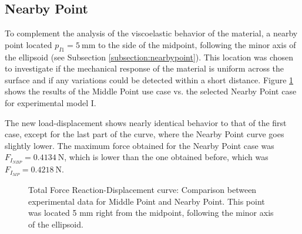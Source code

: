 

\subsection{Nearby Point}
\label{subsection:nearbypointresult}
To complement the analysis of the viscoelastic behavior of the material,
a nearby point located $p_{I1} = \SI{5}{\milli \m}$ to the side of the midpoint,
following the minor axis of the ellipsoid (see Subsection \ref{subsection:nearbypoint}). 
This location was chosen to investigate if the mechanical response of the material 
is uniform across the surface and if any variations could be detected within 
a short distance. Figure \ref{fig:midpointIvsnbpointI} shows the results of the 
Middle Point use case vs. the selected Nearby Point case for experimental model I. 

The new load-displacement shows nearly identical behavior to that of the 
first case, except for the last part of the curve, where the Nearby Point curve goes 
slightly lower. The maximum force obtained for the Nearby Point case was $F_{I_{NBP}} = \SI{0.4134}{\newton}$, 
which is lower than the one obtained before, which was $F_{I_{MP}} = \SI{0.4218}{\newton}$.\\

\begin{figure}%
    \centering
   \quad
   \caption[Experimental data for Middle Point vs. Nearby Point]{Total Force Reaction-Displacement curve: Comparison between experimental data for Middle Point and Nearby Point. This point was located 5 mm right from the midpoint, following the minor axis of the ellipsoid.}%
   \label{fig:midpointIvsnbpointI}%
\end{figure}

